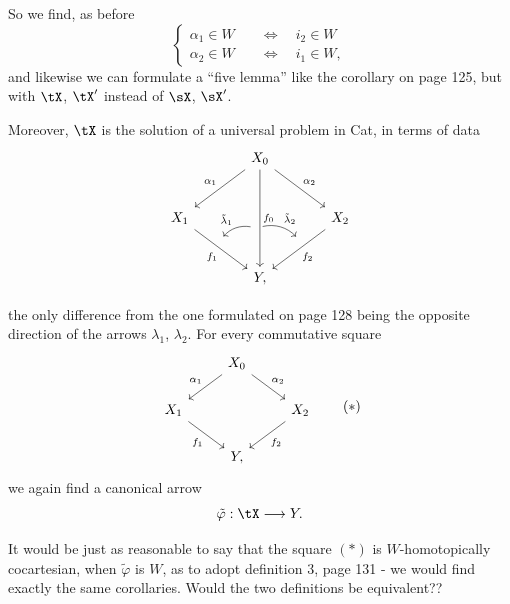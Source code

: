 So we find, as before
\[
\left\{
\begin{aligned}
\alpha_1 \in W &\quad\iff\quad i_2 \in W \\
\alpha_2 \in W &\quad\iff\quad i_1 \in W,
\end{aligned}
\right.
\]
and likewise we can formulate a ``five lemma'' like the corollary on page 125, but with $\tX$, $\tX'$ instead of $\sX$, $\sX'$.

Moreover, $\tX$ is the solution of a universal problem in Cat, in terms of data
\[
\begin{tikzcd}[row sep=large, column sep=large]
 & X_0 \arrow[dl, "\alpha_1"'] \arrow[dr, "\alpha_2"] \arrow[dd, "f_0", ""'{name=G0, pos=0.6}] & \\
X_1 \arrow[dr, "f_1"', ""{name=G1, pos=0.4}] & & X_2 \arrow[dl, "f_2", ""'{name=G2, pos=0.4}] \\
 & Y, &
\arrow[from=G0, to=G1, bend right, "\tilde{\lambda}_1"', shorten <=2pt, shorten >=2pt]
\arrow[from=G0, to=G2, bend left, "\tilde{\lambda}_2", shorten <=2pt, shorten >=2pt]
\end{tikzcd}
\]

the only difference from the one formulated on page 128 being the opposite direction of the arrows $\lambda_1$, $\lambda_2$. For every commutative square
\[
\begin{tikzcd}
 & X_0 \arrow[dl, "\alpha_1"'] \arrow[dr, "\alpha_2"] & \\
X_1 \arrow[dr, "f_1"'] & & X_2 \arrow[dl, "f_2"] \\
 & Y, &
\end{tikzcd}
\tag*{$(*)$}
\]
we again find a canonical arrow
\[
\tilde{\varphi} : \tX \longrightarrow Y.
\]

It would be just as reasonable to say that the square $(*)$ is $W$-homotopically cocartesian, when $\tilde{\varphi}$ is $W$, as to adopt definition 3, page 131 - we would find exactly the same corollaries. Would the two definitions be equivalent?? %
